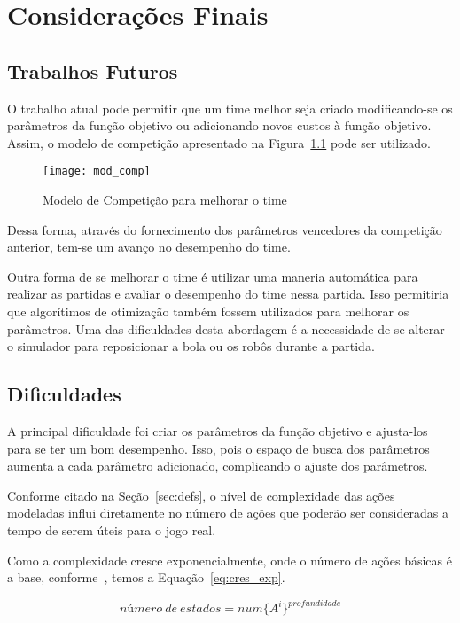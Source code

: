 \chapter{Considerações Finais}\label{cap:cons_finais}

\section{Trabalhos Futuros}

O trabalho atual pode permitir que um time melhor seja criado modificando-se os
parâmetros da função objetivo ou adicionando novos custos à função objetivo.
Assim, o modelo de competição apresentado na Figura~\ref{fig:mod_comp} pode ser
utilizado.

\begin{figure}[H]
  \centering
  \texttt{[image: mod\_comp]}
  \caption{Modelo de Competição para melhorar
           o time}\label{fig:mod_comp}
\end{figure}

Dessa forma, através do fornecimento dos parâmetros vencedores da competição
anterior, tem-se um avanço no desempenho do time.

Outra forma de se melhorar o time é utilizar uma maneria automática para
realizar as partidas e avaliar o desempenho do time nessa partida. Isso
permitiria que algorítimos de otimização também fossem utilizados para melhorar
os parâmetros.  Uma das dificuldades desta abordagem é a necessidade de se
alterar o simulador para reposicionar a bola ou os robôs durante a partida.

\section{Dificuldades}

A principal dificuldade foi criar os parâmetros da função objetivo e
ajusta-los para se ter um bom desempenho. Isso, pois o espaço de busca dos
parâmetros aumenta a cada parâmetro adicionado, complicando o ajuste dos
parâmetros.

Conforme citado na Seção~\ref{sec:defs}, o nível de complexidade das ações
modeladas influi diretamente no número de ações que poderão ser consideradas a
tempo de serem úteis para o jogo real.

Como a complexidade cresce exponencialmente, onde o número de ações básicas é a
base, conforme~\cite{russell2003artificial}, temos a Equação~\ref{eq:cres_exp}.

\begin{dmath}\label{eq:cres_exp}
 número{\ }de{\ }estados = num \lbrace A^i \rbrace ^{profundidade}
\end{dmath}

